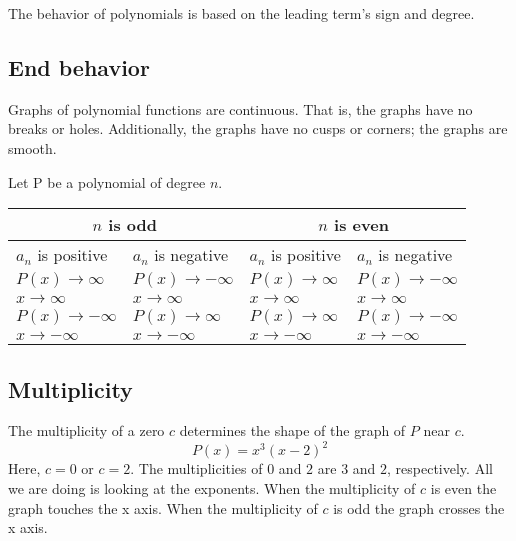 \documentclass{amsbook}
\begin{document}
	The behavior of polynomials is based on the leading term's sign and degree.

\subsection{End behavior}
	Graphs of polynomial functions are continuous.
	That is, the graphs have no breaks or holes.
	Additionally, the graphs have no cusps or corners; the graphs are smooth.

	Let P be a polynomial of degree $n$.
	\begin{center}
	\begin{tabular}{llll}
		\multicolumn{2}{c}{$n$ is odd} & \multicolumn{2}{c}{$n$ is even} \\ \hline
		$a_n$ is positive & $a_n$ is negative & $a_n$ is positive & $a_n$ is negative \\ \hline

		$P(x) \rightarrow \infty$ 	& $P(x) \rightarrow -\infty$
		& $P(x) \rightarrow \infty$	& $P(x) \rightarrow -\infty$ \\
		$x \rightarrow \infty$		& $x \rightarrow \infty$
		& $x \rightarrow \infty$	& $x \rightarrow \infty$ \\ \hline

		$P(x) \rightarrow -\infty$	& $P(x) \rightarrow \infty$
		& $P(x) \rightarrow \infty$	& $P(x) \rightarrow -\infty$ \\
		$x \rightarrow -\infty$		& $x \rightarrow -\infty$
		& $x \rightarrow -\infty$	& $x \rightarrow -\infty$
	\end{tabular}
	\end{center}

\subsection{Multiplicity}
	The multiplicity of a zero $c$ determines the shape of the graph of $P$ near $c$.
	\begin{equation*}
		P(x) = x^3(x-2)^2
	\end{equation*}
	Here, $c = 0$ or $c = 2$.
	The multiplicities of $0$ and $2$ are $3$ and $2$, respectively.
	All we are doing is looking at the exponents.
	When the multiplicity of $c$ is even the graph touches the x axis.
	When the multiplicity of $c$ is odd the graph crosses the x axis.
\end{document}
